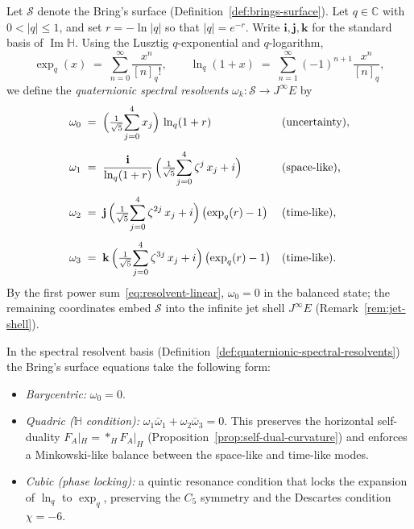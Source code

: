 \begin{definition}
\label{def:quaternionic-spectral-resolvents}
Let $\mathcal{S}$ denote the Bring's surface
(Definition~\ref{def:brings-surface}).  Let $q\in\mathbb{C}$ with
$0<\lvert q\rvert\le 1$, and set $r=-\ln\lvert q\rvert$ so that
$\lvert q\rvert=e^{-r}$.
Write $\mathbf{i},\mathbf{j},\mathbf{k}$ for the standard basis of
$\operatorname{Im}\mathbb{H}$.
Using the Lusztig $q$-exponential and $q$-logarithm,
\begin{equation}\label{eq:q-exp}
  \exp_q(x)\;=\;\sum_{n=0}^{\infty}\frac{x^n}{[n]_q!},
  \qquad
  \ln_q(1+x)\;=\;\sum_{n=1}^{\infty}(-1)^{n+1}\frac{x^n}{[n]_q},
\end{equation}
we define the \emph{quaternionic spectral resolvents}
$\omega_k\colon\mathcal{S}\to J^\infty E$ by
\begin{align}
  \omega_0 &\;=\;
    \Bigl(\tfrac{1}{\sqrt{5}}\!\sum_{j=0}^{4}x_j\Bigr)\,
    \ln_q(1+r)
    &&\text{(uncertainty),}
    \label{eq:omega-0}\\[4pt]
  \omega_1 &\;=\;
    \frac{\mathbf{i}}{\ln_q(1+r)}\,
    \Bigl(\tfrac{1}{\sqrt{5}}\!\sum_{j=0}^{4}\zeta^{j}\,x_j+i\Bigr)
    &&\text{(space-like),}
    \label{eq:omega-1}\\[4pt]
  \omega_2 &\;=\;
    \mathbf{j}\,
    \Bigl(\tfrac{1}{\sqrt{5}}\!\sum_{j=0}^{4}\zeta^{2j}\,x_j+i\Bigr)\,
    \bigl(\exp_q(r)-1\bigr)
    &&\text{(time-like),}
    \label{eq:omega-2}\\[4pt]
  \omega_3 &\;=\;
    \mathbf{k}\,
    \Bigl(\tfrac{1}{\sqrt{5}}\!\sum_{j=0}^{4}\zeta^{3j}\,x_j+i\Bigr)\,
    \bigl(\exp_q(r)-1\bigr)
    &&\text{(time-like).}
    \label{eq:omega-3}
\end{align}
By the first power sum~\eqref{eq:resolvent-linear}, $\omega_0=0$ in the
balanced state; the remaining coordinates embed $\mathcal{S}$ into the
infinite jet shell $J^\infty E$
(Remark~\ref{rem:jet-shell}).
\end{definition}

\begin{remark}
\label{rem:omega-constraints}
In the spectral resolvent basis
(Definition~\ref{def:quaternionic-spectral-resolvents}) the
Bring's surface equations take the following form:
\begin{itemize}
\item \emph{Barycentric:}\; $\omega_0=0$.
\item \emph{Quadric ($\mathbb{H}$ condition):}\;
  $\omega_1\bar{\omega}_1+\omega_2\bar{\omega}_3=0$.
  This preserves the horizontal self-duality $F_A|_H={*_H}F_A|_H$
  (Proposition~\ref{prop:self-dual-curvature}) and enforces a
  Minkowski-like balance between the space-like and time-like modes.
\item \emph{Cubic (phase locking):}\; a quintic resonance condition that
  locks the expansion of $\ln_q$ to $\exp_q$, preserving the $C_5$
  symmetry and the Descartes condition $\chi=-6$.
\end{itemize}
\end{remark}

